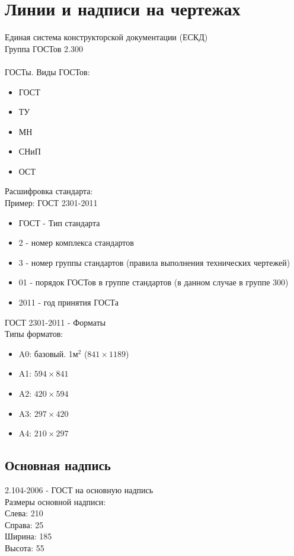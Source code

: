 \documentclass[a4paper, 11pt, oneside]{article}
\begin{document}
\section{Линии и надписи на чертежах}
Единая система конструкторской документации (ЕСКД)\\
Группа ГОСТов 2.300\\\\
ГОСТы. Виды ГОСТов:
\begin{itemize}
	\item ГОСТ
	\item ТУ
	\item МН
	\item СНиП
	\item ОСТ
\end{itemize}
Расшифровка стандарта:\\
Пример: ГОСТ 2301-2011
\begin{itemize}
	\item ГОСТ - Тип стандарта
	\item 2 - номер комплекса стандартов
	\item 3 - номер группы стандартов (правила выполнения технических чертежей)
	\item 01 - порядок ГОСТов в группе стандартов (в данном случае в группе 300)
	\item 2011 - год принятия ГОСТа
\end{itemize}
ГОСТ 2301-2011 - Форматы\\
Типы форматов:
\begin{itemize}
	\item A0: базовый. 1м$^2$ ($841\times1189$)
	\item A1: $594\times841$
	\item A2: $420\times594$
	\item A3: $297\times420$
	\item A4: $210\times297$
\end{itemize}

\subsection{Основная надпись}
2.104-2006 - ГОСТ на основную надпись\\
Размеры основной надписи:\\
Слева: 210\\
Справа: 25\\
Ширина: 185\\
Высота: 55\\
\end{document}
